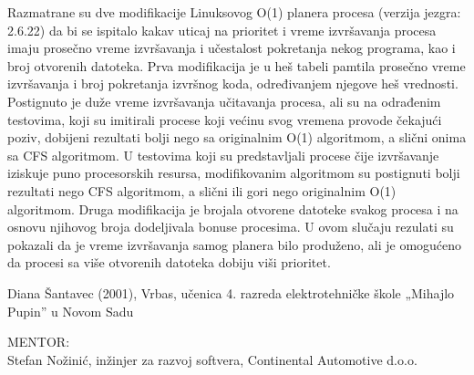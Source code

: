 \hyphenation{
}

\begin{Abstract}
Razmatrane su dve modifikacije Linuksovog O(1) planera procesa (verzija jezgra: 2.6.22) da bi se ispitalo kakav uticaj na prioritet i vreme izvršavanja procesa imaju prosečno vreme izvršavanja i učestalost pokretanja nekog programa, kao i broj otvorenih datoteka. Prva modifikacija je u heš tabeli pamtila prosečno vreme izvršavanja i broj pokretanja izvršnog koda, određivanjem njegove heš vrednosti. Postignuto je duže vreme izvršavanja učitavanja procesa, ali su na odrađenim testovima, koji su imitirali procese koji većinu svog vremena provode čekajući poziv, dobijeni rezultati bolji nego sa originalnim O(1) algoritmom, a slični onima sa CFS algoritmom. U testovima koji su predstavljali procese čije izvršavanje iziskuje puno procesorskih resursa, modifikovanim algoritmom su postignuti bolji rezultati nego CFS algoritmom, a slični ili gori nego originalnim O(1) algoritmom. Druga modifikacija je brojala otvorene datoteke svakog procesa i na osnovu njihovog broja dodeljivala bonuse procesima. U ovom slučaju rezulati su pokazali da je vreme izvršavanja samog planera bilo produženo, ali je omogućeno da procesi sa više otvorenih datoteka dobiju viši prioritet.
\end{Abstract}
\begin{AuthorEx}
Diana Šantavec (2001), Vrbas, učenica 4. razreda elektrotehničke škole „Mihajlo Pupin” u Novom Sadu

MENTOR:\\
Stefan Nožinić, inžinjer za razvoj softvera, Continental Automotive d.o.o.
\end{AuthorEx}
